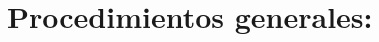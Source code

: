 \documentclass[letter]{article}
\begin{document}
\section{Procedimientos generales:}





\begin{comment}
Para la instalación y puesta en marcha de la biblioteca de Python llamada OpenCV, se hizo uso de la documentación oficial de dicha biblioteca.\footnote{http://docs.opencv.org/trunk/doc/py\_tutorials/py\_tutorials.html}\\
De dicha documentación oficial, los tutoriales útiles fueron los 3 primeros, a saber: \textit{Introduction to OpenCV}, \textit{Gui features in OpenCV} y \textit{Core operations}.\\
Se dará a continuación una descripción general de cada uno de esos tutoriales; principalmente se hará mención de los aspectos más importantes para el desarrollo de este proyecto:
\subsection{\normalsize \textit{Introduction to OpenCV}}
Antes que todo, es importante hacer mención de algunas generalidades de OpenCV. OpenCV fue iniciado en Intel, en 1999. OpenCV-Python es el API de Python para OpenCV. Este API hace uso de la capacidad que se tiene en Python de crear \textit{wrappers}, los cuales consisten en código de C o C++, el cual luego se empaqueta y es llamado desde Python. Así, básicamente lo que se hace en OpenCV-Python es un uso directo del API de OpenCV para C++, y se aprovechan además ciertas características importantes de Python.\\
Un buen conocimiento de Numpy es requerido\footnote{http://wiki.scipy.org/Tentative\_NumPy\_Tutorial}, en caso de que se quiera hacer un uso provechoso (desde el punto de vista de la escritura de códigos optimizados) de OpenCV-Python.\\
En cuanto a la versión de Python que se utilizará en este proyecto, es la 2.7.4. En Ubuntu (el sistema operativo sobre el cual se desarrolló este programa), Python viene instalado por defecto, así como python-numpy.\\
Por otro lado, es necesario instalar OpenCV:
\lstset{language=bash}
\begin{lstlisting}
$ sudo aptitude install libopencv-dev
\end{lstlisting}


\end{comment}
\end{document}
